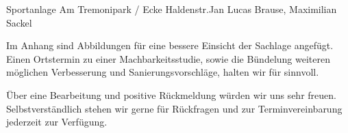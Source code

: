 \documentclass{../../templates/amendment}
\begin{document}
\begin{boxed}{Sportanlage Am Tremonipark / Ecke Haldenstr.}{Jan Lucas Brause, Maximilian Sackel}

    Im Anhang sind Abbildungen für eine bessere Einsicht der Sachlage
    angefügt.
    Einen Ortstermin zu einer Machbarkeitsstudie, sowie die Bündelung weiteren
    möglichen Verbesserung und Sanierungsvorschläge, halten wir für sinnvoll.

    Über eine Bearbeitung und positive Rückmeldung würden wir uns sehr freuen.
    Selbstverständlich stehen wir gerne für Rückfragen
    und zur Terminvereinbarung jederzeit zur Verfügung.


\end{boxed}
\end{document}

